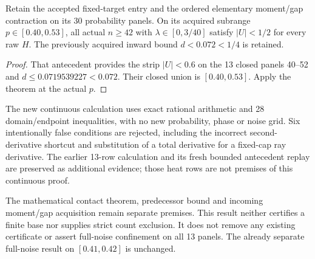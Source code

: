 \documentclass[11pt]{article}
\begin{document}
\begin{corollary}\label{ln:application}
Retain the accepted fixed-target entry and the ordered elementary
moment/gap contraction on its 30 probability panels. On its acquired
subrange $p\in[0.40,0.53]$, all actual $n\ge42$ with
$\lambda\in[0,3/40]$ satisfy $|U|<1/2$ for every raw $H$.
The previously acquired inward bound $d<0.072<1/4$ is retained.
\end{corollary}
\begin{proof}
That antecedent provides the strip $|U|<0.6$ on the 13 closed panels
40--52 and $d\le0.0719539227<0.072$.
Their closed union is $[0.40,0.53]$. Apply the theorem at the actual $p$.
\end{proof}

The new continuous calculation uses exact rational arithmetic and 28
domain/endpoint inequalities, with no new probability, phase or noise
grid. Six intentionally false conditions are rejected, including the
incorrect second-derivative shortcut and substitution of a total
derivative for a fixed-cap ray derivative. The earlier 13-row calculation
and its fresh bounded antecedent replay are preserved as additional
evidence; those heat rows are not premises of this continuous proof.

The mathematical contact theorem, predecessor bound and incoming
moment/gap acquisition remain separate premises. This result neither
certifies a finite base nor supplies strict count exclusion. It does not
remove any existing certificate or assert full-noise confinement on all
13 panels. The already separate full-noise result on $[0.41,0.42]$ is
unchanged.
\end{document}
